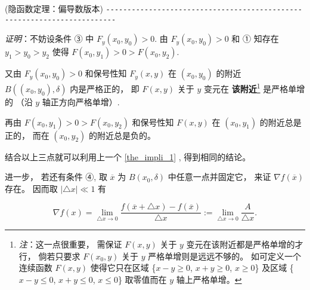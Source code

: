 \begin{theorem}{(隐函数定理：偏导数版本)}
\verb|------------------------------------------------------------------------|

\textsl{证明}：不妨设条件 ③ 中 $F_{y}(x_{0},y_{0})>0.$ 由 $F_{y}(x_{0},y_{0})>0$ 和
① 知存在 $y_{1}>y_{0}>y_{2}$ 使得 $F(x_{0},y_{1})>0>F(x_{0},y_{2})$. 

又由 $F_{y}(x_{0},y_{0})>0$ 和保号性知 $F_{y}(x,y)$ 在 $(x_{0},y_{0})$
的附近 $B((x_{0},y_{0}),\delta)$ 内是严格正的， 即 $F(x,y)$ 关于 $y$ 变元在 \textbf{该附近}\footnote{\textsl{注}：这一点很重要， 需保证 $F(x,y)$ 关于 $y$ 变元在该附近都是严格单增的才行， 倘若只要求 $F(x_{0},y)$
关于 $y$ 严格单增则是远远不够的。 如可定义一个连续函数 $F(x,y)$ 使得它只在区域 \{$x-y\geqslant0$,
$x+y\geqslant0$, $x\geqslant0$\} 及区域 \{$x-y\leqslant0$, $x+y\leqslant0$,
$x\leqslant0$\} 取零值而在 $y$ 轴上严格单增。 } 是严格单增的 （沿 $y$ 轴正方向严格单增）. 

再由 $F(x_{0},y_{1})>0>F(x_{0},y_{2})$ 和保号性知 $F(x,y)$ 在 $(x_{0},y_{1})$
的附近总是正的， 而在 $(x_{0},y_{2})$ 的附近总是负的。 

结合以上三点就可以利用上一个 \autoref{the_impli_1} , 得到相同的结论。 

进一步， 若还有条件 ④, 取 \textbf{$\overline{x}$ }为 $B(x_{0},\delta)$ 中任意一点并固定它， 来证 $\nabla f(\overline{x})$存在。 因而取 $\left|\triangle x\right|\ll1$
有

\begin{equation}\label{eq_impli_1}
\nabla f(x)={\displaystyle {\displaystyle \lim_{\triangle x\rightarrow0}}\frac{f(\overline{x}+\triangle x)-f(\overline{x})}{\triangle x}:={\displaystyle \lim_{\triangle x\rightarrow0}}\frac{A}{\triangle x}}.
\end{equation}


\end{theorem}

